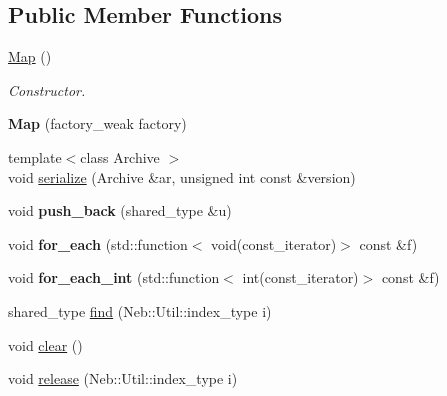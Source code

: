 \subsection*{\-Public \-Member \-Functions}
\begin{DoxyCompactItemize}
\item 
\hypertarget{classNeb_1_1Map_a7824cc27bb79eccafafeec2bf85b17c6}{\hyperlink{classNeb_1_1Map_a7824cc27bb79eccafafeec2bf85b17c6}{\-Map} ()}\label{classNeb_1_1Map_a7824cc27bb79eccafafeec2bf85b17c6}

\begin{DoxyCompactList}\small\item\em \-Constructor. \end{DoxyCompactList}\item 
\hypertarget{classNeb_1_1Map_a7e15e6246362cebda8a9fbf6e4fdfff2}{{\bfseries \-Map} (factory\-\_\-weak factory)}\label{classNeb_1_1Map_a7e15e6246362cebda8a9fbf6e4fdfff2}

\item 
{\footnotesize template$<$class Archive $>$ }\\void \hyperlink{classNeb_1_1Map_a2657f69e25b421e8fab7a6e7cb116d77}{serialize} (\-Archive \&ar, unsigned int const \&version)
\item 
\hypertarget{classNeb_1_1Map_a628b2826bd845181f8fdec7de0255aff}{void {\bfseries push\-\_\-back} (shared\-\_\-type \&u)}\label{classNeb_1_1Map_a628b2826bd845181f8fdec7de0255aff}

\item 
\hypertarget{classNeb_1_1Map_acfbabacf4a96b2ce9e87e68d2ae3c8eb}{void {\bfseries for\-\_\-each} (std\-::function$<$ void(const\-\_\-iterator)$>$ const \&f)}\label{classNeb_1_1Map_acfbabacf4a96b2ce9e87e68d2ae3c8eb}

\item 
\hypertarget{classNeb_1_1Map_ae7f37f2c1b1c66ac23266c40ffac6e35}{void {\bfseries for\-\_\-each\-\_\-int} (std\-::function$<$ int(const\-\_\-iterator)$>$ const \&f)}\label{classNeb_1_1Map_ae7f37f2c1b1c66ac23266c40ffac6e35}

\item 
shared\-\_\-type \hyperlink{classNeb_1_1Map_ae16c01229f322a7eae651170297ac18a}{find} (\-Neb\-::\-Util\-::index\-\_\-type i)
\item 
void \hyperlink{classNeb_1_1Map_ae0fedef74480d411f5b35583927e237c}{clear} ()
\item 
void \hyperlink{classNeb_1_1Map_a9d025162874515cefab704876b7892a0}{release} (\-Neb\-::\-Util\-::index\-\_\-type i)
\end{DoxyCompactItemize}
